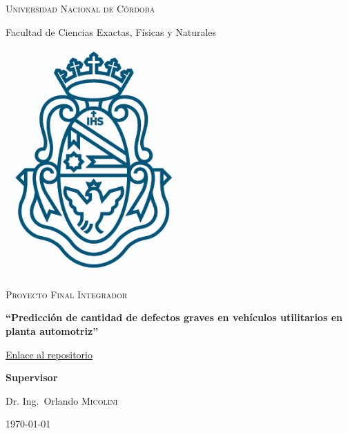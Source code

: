 \documentclass[a4paper,12pt]{article}
\author{Gerardo A. COLLANTE \\ Matrícula: 39.022.782 \\ Email: \href{mailto:gerardo.collante@unc.edu.ar}{gerardo.collante@unc.edu.ar} \\ Cel: 54 (03574) 650490}
\begin{document}
\makeatletter
\begin{titlepage}
			
	{\scshape\LARGE Universidad Nacional de Córdoba \par}
	{\Large Facultad de Ciencias Exactas, Físicas y Naturales \par}
	\vspace{0.5cm}
	\centering
	\includegraphics[width=0.5\textwidth]{unc.png}
	\par\vspace{0.5cm}
	\vspace{0.5cm}
	{\scshape\Large Proyecto Final Integrador\par}
	\vspace{1cm}
	{\large\bfseries ``Predicción de cantidad de defectos graves en vehículos utilitarios en planta automotriz'' \par}

	\vspace{0.25cm}
	
	\href{https://github.com/GeraCollante/tesis-icomp-machinelearning}{\color{blue}Enlace al repositorio}
	
	\vspace{0.7cm}
			
	\normalsize\@author\space
			
	\vspace{0.7cm}
	\textbf{Supervisor}\par
	Dr. Ing.~Orlando \textsc{Micolini}
		
	\vfill
		
	{\large \today\par}
\end{titlepage}
\end{document}
